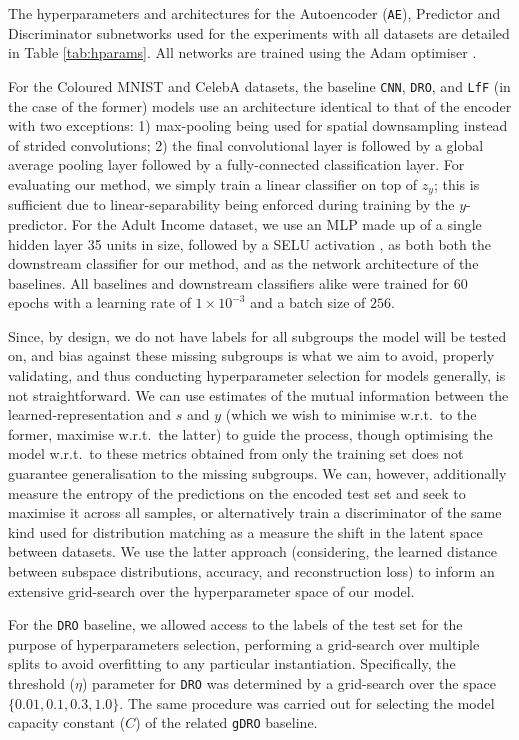 The hyperparameters and architectures for the Autoencoder (\texttt{AE}), Predictor and Discriminator subnetworks used for the experiments with all datasets are detailed in Table \ref{tab:hparams}. All networks are trained using the Adam optimiser \citep{kingma2015adam}.

For the Coloured MNIST and CelebA datasets, the baseline \texttt{CNN}, \texttt{DRO}, and \texttt{LfF} (in the case of the former) models use an architecture identical to that of the encoder with two exceptions: 1) max-pooling being used for spatial downsampling instead of strided convolutions; 2) the final convolutional layer is followed by a global average pooling layer followed by a fully-connected classification layer. For evaluating our method, we simply train a linear classifier on top of $z_y$; this is sufficient due to linear-separability being enforced during training by the $y$-predictor.
For the Adult Income dataset, we use an \ac{MLP} made up of a single hidden layer 35 units in size, followed by a SELU activation \citep{klambauer2017self}, as both both the downstream classifier for our method, and as the network architecture of the baselines. 
All baselines and downstream classifiers alike were trained for $60$ epochs with a learning rate of $1 \times 10^{-3}$ and a batch size of $256$.

Since, by design, we do not have labels for all subgroups the model will be tested on, and bias against these missing subgroups is what we aim to avoid, properly validating, and thus conducting hyperparameter selection for models generally, is not straightforward.
We can use estimates of the mutual information between the learned-representation and $s$ and $y$ (which we wish to minimise w.r.t.\ to the former, maximise w.r.t.\ the latter) to guide the process, though optimising the model w.r.t.\ to these metrics obtained from only the training set does not guarantee generalisation to the missing subgroups.
We can, however, additionally measure the entropy of the predictions on the encoded test set and seek to maximise it across all samples, or alternatively train a discriminator of the same kind used for distribution matching as a measure the shift in the latent space between datasets.
We use the latter approach (considering, the learned distance between subspace distributions, accuracy, and reconstruction loss) to inform an extensive grid-search over the hyperparameter space of our model.

For the \texttt{DRO} baseline, we allowed access to the labels of the test set for the purpose of hyperparameters selection, performing a grid-search over multiple splits to avoid overfitting to any particular instantiation.
Specifically, the threshold ($\eta$) parameter for \texttt{DRO} was determined by a grid-search over the space $\{0.01, 0.1, 0.3, 1.0\}$. The same procedure was carried out for selecting the model capacity constant ($C$) of the related \texttt{gDRO} baseline.

